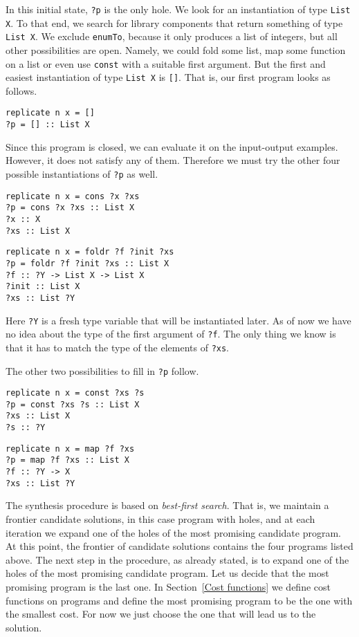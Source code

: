 In this initial state, \lstinline!?p! is the only hole. We look for an instantiation of type \lstinline!List X!. To that end, we search for library components that return something of type \lstinline?List X?. We exclude \lstinline?enumTo?, because it only produces a list of integers, but all other possibilities are open. Namely, we could fold some list, map some function on a list or even use \lstinline?const? with a suitable first argument. But the first and easiest instantiation of type \lstinline?List X? is \lstinline?[]?. That is, our first program looks as follows.
\begin{lstlisting}[style=plain]
replicate n x = []
?p = [] :: List X
\end{lstlisting}
Since this program is closed, we can evaluate it on the input-output examples. However, it does not satisfy any of them. Therefore we must try the other four possible instantiations of \lstinline!?p! as well.

\begin{lstlisting}[style=plain]
replicate n x = cons ?x ?xs
?p = cons ?x ?xs :: List X
?x :: X
?xs :: List X
\end{lstlisting}

\begin{lstlisting}[style=plain]
replicate n x = foldr ?f ?init ?xs
?p = foldr ?f ?init ?xs :: List X
?f :: ?Y -> List X -> List X
?init :: List X
?xs :: List ?Y
\end{lstlisting}
Here \lstinline!?Y! is a fresh type variable that will be instantiated later. As of now we have no idea about the type of the first argument of \lstinline!?f!. The only thing we know is that it has to match the type of the elements of \lstinline!?xs!.

The other two possibilities to fill in \lstinline!?p! follow.

\begin{lstlisting}[style=plain]
replicate n x = const ?xs ?s
?p = const ?xs ?s :: List X
?xs :: List X
?s :: ?Y
\end{lstlisting}

\begin{lstlisting}[style=plain]
replicate n x = map ?f ?xs
?p = map ?f ?xs :: List X
?f :: ?Y -> X
?xs :: List ?Y
\end{lstlisting}

The synthesis procedure is based on \emph{best-first search}. That is, we maintain a frontier candidate solutions, in this case program with holes, and at each iteration we expand one of the holes of the most promising candidate program. At this point, the frontier of candidate solutions contains the four programs listed above.
The next step in the procedure, as already stated, is to expand one of the holes of the most promising candidate program.
Let us decide that the most promising program is the last one. In Section~\ref{Cost functions} we define cost functions on programs and define the most promising program to be the one with the smallest cost. For now we just choose the one that will lead us to the solution.


